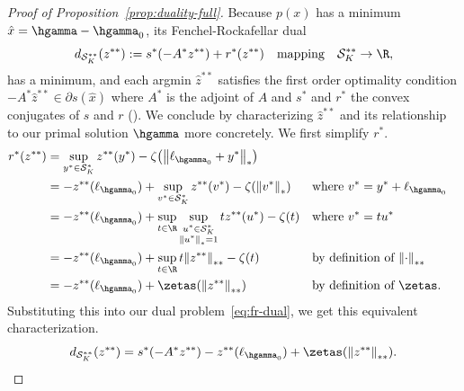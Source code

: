\documentclass{article}
\newcommand{\calS}{\mathcal{S}}
\begin{document}
\begin{proof}[Proof of
Proposition~\ref{prop:duality-full}]
Because $p(x)$ has a minimum $\hat x = \hgamma - \hgamma_0$,
its Fenchel-Rockafellar dual
\begin{equation}
\label{eq:fr-dual}
    d_{\calS_K^{**}}(z^{**}) := s^{*}(-A^{*} z^{**}) + r^{*}(z^{**}) \quad \text{mapping} \quad \calS_K^{**} \to \R,
\end{equation}
has a minimum, and each argmin $\hat z^{**}$ satisfies the first order optimality condition $-A^{*} \hat z^{**} \in \partial s(\hat x)$ where $A^{*}$ is the adjoint of $A$ and $s^{*}$ and $r^{*}$ the convex conjugates of $s$ and $r$ ().
We conclude by characterizing $\hat z^{**}$ and its relationship to our primal solution $\hgamma$ more concretely.
We first simplify $r^*$.
\begin{align*}
    r^{*}(z^{**}) &= \sup_{y^* \in \calS_K^*} z^{**}(y^*) - \zeta\qty(\norm{\ell_{\hgamma_0} + y^*}_{*}) \\
                       &= - z^{**}(\ell_{\hgamma_0}) + \sup_{v^* \in \calS_K^*} z^{**}(v^*) - \zeta\qty(\norm{v^*}_{*}) && \text{where } v^* = y^* + \ell_{\hgamma_0} \\
                       &= - z^{**}(\ell_{\hgamma_0}) + \sup_{t \in \R}\sup_{\substack{u^* \in \calS_K^* \\ \norm{u^*}_{*}=1}} t z^{**}(u^*) - \zeta(t) && \text{where } v^* = t u^* \\
                       &= - z^{**}(\ell_{\hgamma_0}) + \sup_{t \in \R}t\norm{z^{**}}_{**} - \zeta(t) && \text{by definition of } \norm{\cdot}_{**} \\
                       &= - z^{**}(\ell_{\hgamma_0}) + \zetas\qty(\norm{z^{**}}_{**}) && \text{by definition of } \zetas.
\end{align*}
Substituting this into our dual problem~\eqref{eq:fr-dual}, we get this equivalent characterization.
\begin{equation}
\label{eq:dual-for-bidual-elements}
    d_{\calS_K^{**}}(z^{**}) = s^{*}(-A^{*} z^{**}) - z^{**}(\ell_{\hgamma_0}) + \zetas\qty(\norm{z^{**}}_{**}).
\end{equation}


\end{proof}
\end{document}

